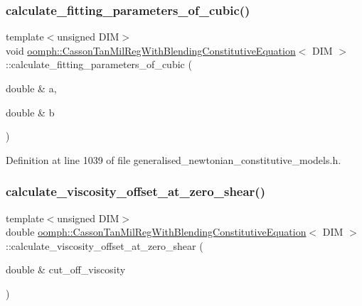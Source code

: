 \subsubsection{\texorpdfstring{calculate\+\_\+fitting\+\_\+parameters\+\_\+of\+\_\+cubic()}{calculate\_fitting\_parameters\_of\_cubic()}}
{\footnotesize\ttfamily template$<$unsigned D\+IM$>$ \\
void \hyperlink{classoomph_1_1CassonTanMilRegWithBlendingConstitutiveEquation}{oomph\+::\+Casson\+Tan\+Mil\+Reg\+With\+Blending\+Constitutive\+Equation}$<$ D\+IM $>$\+::calculate\+\_\+fitting\+\_\+parameters\+\_\+of\+\_\+cubic (\begin{DoxyParamCaption}\item[{double \&}]{a,  }\item[{double \&}]{b }\end{DoxyParamCaption})\hspace{0.3cm}{\ttfamily [inline]}}



Definition at line 1039 of file generalised\+\_\+newtonian\+\_\+constitutive\+\_\+models.\+h.

\mbox{\label{classoomph_1_1CassonTanMilRegWithBlendingConstitutiveEquation_af844c87f95a40d6c503bbaee6292482b}} 
\subsubsection{\texorpdfstring{calculate\+\_\+viscosity\+\_\+offset\+\_\+at\+\_\+zero\+\_\+shear()}{calculate\_viscosity\_offset\_at\_zero\_shear()}}
{\footnotesize\ttfamily template$<$unsigned D\+IM$>$ \\
double \hyperlink{classoomph_1_1CassonTanMilRegWithBlendingConstitutiveEquation}{oomph\+::\+Casson\+Tan\+Mil\+Reg\+With\+Blending\+Constitutive\+Equation}$<$ D\+IM $>$\+::calculate\+\_\+viscosity\+\_\+offset\+\_\+at\+\_\+zero\+\_\+shear (\begin{DoxyParamCaption}\item[{double \&}]{cut\+\_\+off\+\_\+viscosity }\end{DoxyParamCaption})\hspace{0.3cm}{\ttfamily [inline]}}

